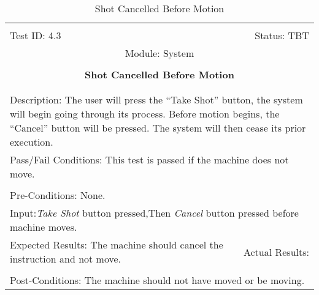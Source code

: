 \documentclass[titlepage]{article}
\begin{document}
\begin{center}%
\begin{table}[h!]
\begin{tabular}{|l r|}\hline&\\[-2mm]
	Test ID: 4.3	&Status: TBT\\[-3mm]
	\multicolumn{2}{|c|}{Module: System}\\&\\
	\multicolumn{2}{|c|}{\textbf{\large{Shot Cancelled Before Motion}}}\\&\\\hline&\\[-3mm]
	\multicolumn{2}{|p{\textwidth}|}{Description: The user will press the ``Take Shot'' button, the system will begin going through its process. Before motion begins, the ``Cancel'' button will be pressed. The system will then cease its prior execution.}\\\hline
	\multicolumn{2}{|p{\textwidth}|}{Pass/Fail Conditions: This test is passed if the machine does not move.}\\[1mm]\hline&\\[-3mm]
	\multicolumn{2}{|p{\textwidth}|}{Pre-Conditions: None.}\\[4mm]
	\multicolumn{2}{|p{\textwidth}|}{Input:\newline\textit{Take Shot} button pressed,\newline Then \textit{Cancel} button pressed before machine moves.}\\[2mm]\hline
	\multicolumn{1}{|p{0.49\textwidth}}{Expected Results: The machine should cancel the instruction and not move.}	&\multicolumn{1}{|p{0.45\textwidth}|}{Actual Results: }\\\hline&\\[-3mm]
	\multicolumn{2}{|p{\textwidth}|}{Post-Conditions: The machine should not have moved or be moving.}\\\hline
\end{tabular}
\caption{Shot Cancelled Before Motion}
\end{table}
\end{center}
\end{document}
